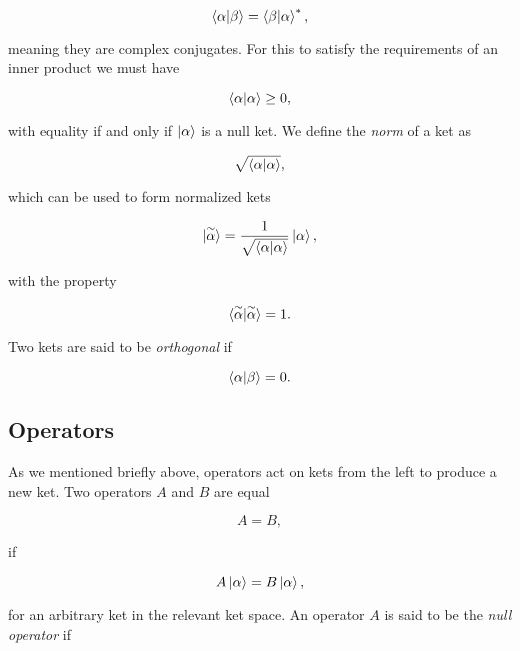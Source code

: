 \begin{equation}
\braket{\alpha | \beta} = \braket{\beta | \alpha}^* ,
\end{equation}

meaning they are complex conjugates.
For this to satisfy the requirements of an inner product we must have

\begin{equation}
\braket{\alpha | \alpha} \geq 0 ,
\end{equation}

with equality if and only if $\ket{\alpha}$ is a null ket.
We define the \textit{norm} of a ket as

\begin{equation}
\sqrt{\braket{\alpha | \alpha}} ,
\end{equation}

which can be used to form normalized kets

\begin{equation}
\ket{\overset{\sim}{\alpha}} =
\frac{1}{\sqrt{\braket{\alpha | \alpha}}} \ket{\alpha} ,
\end{equation}

with the property

\begin{equation}
\braket{\overset{\sim}{\alpha} | \overset{\sim}{\alpha}} = 1 .
\end{equation}

Two kets are said to be \textit{orthogonal} if

\begin{equation}
 \braket{\alpha | \beta} = 0 .
\end{equation}

\subsection{Operators}
As we mentioned briefly above, operators act on kets from the left
to produce a new ket. Two operators $A$ and $B$ are equal

\begin{equation}
 A = B ,
\end{equation}

if

\begin{equation}
 A \ket{\alpha} = B \ket{\alpha} ,
\end{equation}

for an arbitrary ket in the relevant ket space. An operator $A$
is said to be the \textit{null operator} if

